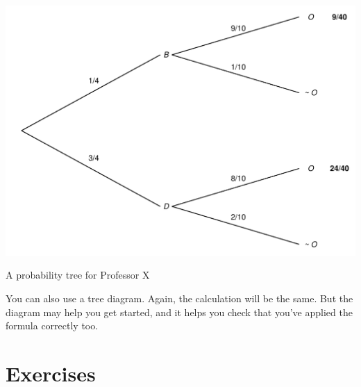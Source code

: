 \documentclass[justified]{tufte-book}
\theoremstyle{definition}
\theoremstyle{definition}
\theoremstyle{definition}
\theoremstyle{remark}
\begin{document}
\begin{marginfigure}
\includegraphics{_main_files/figure-latex/unnamed-chunk-75-5} \caption[A probability tree for Professor X]{A probability tree for Professor X}\label{fig:unnamed-chunk-75}
\end{marginfigure}

You can also use a tree diagram. Again, the calculation will be the same. But the diagram may help you get started, and it helps you check that you've applied the formula correctly too.

\hypertarget{exercises-5}{%
\section*{Exercises}\label{exercises-5}}
\end{document}
